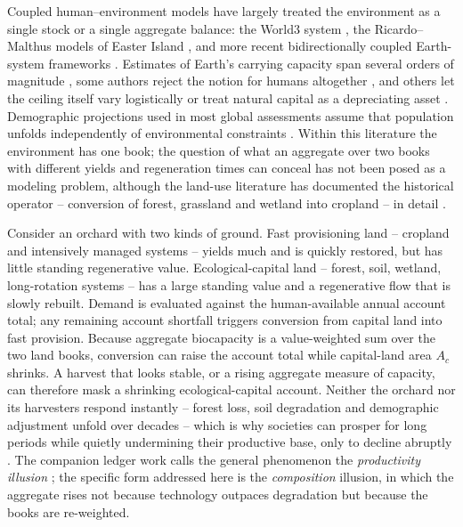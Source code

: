 \documentclass[preprint,12pt,authoryear]{elsarticle}
\begin{document}
Coupled human--environment models have largely treated the environment as a single stock or a single aggregate balance: the World3 system \citep{Meadows1972,Meadows1974,Meadows2004}, the Ricardo--Malthus models of Easter Island \citep{BranderTaylor1998,Anderies2000}, and more recent bidirectionally coupled Earth-system frameworks \citep{Motesharrei2016,Donges2017,CalvinBondLamberty2018,HendersonLoreau2018}. Estimates of Earth's carrying capacity span several orders of magnitude \citep{Cohen1995,vdBerghRietveld2004}, some authors reject the notion for humans altogether \citep{Simon1996}, and others let the ceiling itself vary logistically \citep{Meyer1994,MeyerAusubel1999} or treat natural capital as a depreciating asset \citep{Dasgupta2021}. Demographic projections used in most global assessments assume that population unfolds independently of environmental constraints \citep{UN2022}. Within this literature the environment has one book; the question of what an aggregate over two books with different yields and regeneration times can conceal has not been posed as a modeling problem, although the land-use literature has documented the historical operator -- conversion of forest, grassland and wetland into cropland -- in detail \citep{Haberl2007,Krausmann2013,Erb2017}.

Consider an orchard with two kinds of ground. Fast provisioning land -- cropland and intensively managed systems -- yields much and is quickly restored, but has little standing regenerative value. Ecological-capital land -- forest, soil, wetland, long-rotation systems -- has a large standing value and a regenerative flow that is slowly rebuilt. Demand is evaluated against the human-available annual account total; any remaining account shortfall triggers conversion from capital land into fast provision. Because aggregate biocapacity is a value-weighted sum over the two land books, conversion can raise the account total while capital-land area $A_c$ shrinks. A harvest that looks stable, or a rising aggregate measure of capacity, can therefore mask a shrinking ecological-capital account. Neither the orchard nor its harvesters respond instantly -- forest loss, soil degradation and demographic adjustment unfold over decades -- which is why societies can prosper for long periods while quietly undermining their productive base, only to decline abruptly \citep{Tainter1988,Diamond2005}. The companion ledger work calls the general phenomenon the \emph{productivity illusion} \citep{Abaee2026c}; the specific form addressed here is the \emph{composition} illusion, in which the aggregate rises not because technology outpaces degradation but because the books are re-weighted.
\end{document}
